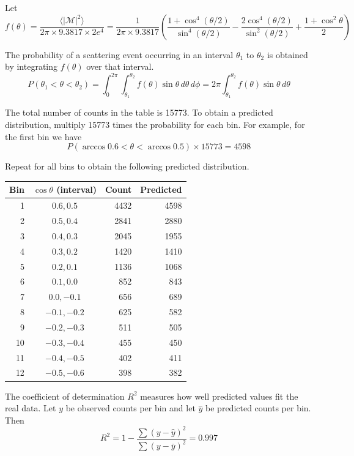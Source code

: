 \documentclass[12pt]{article}
\begin{document}
\noindent
Let
\begin{equation*}
f(\theta)=\frac{\langle|\mathcal{M}|^2\rangle}{2\pi\times9.3817\times 2e^4}
=\frac{1}{2\pi\times9.3817}
\left(
\frac{1+\cos^4(\theta/2)}{\sin^4(\theta/2)}
-\frac{2\cos^4(\theta/2)}{\sin^2(\theta/2)}
+\frac{1+\cos^2\theta}{2}
\right)
\end{equation*}

\noindent
The probability of a scattering event occurring in an interval $\theta_1$ to $\theta_2$ is obtained
by integrating $f(\theta)$ over that interval.
\begin{equation*}
P(\theta_1<\theta<\theta_2)=\int_0^{2\pi}\int_{\theta_1}^{\theta_2}f(\theta)\sin\theta\,d\theta\,d\phi
=2\pi\int_{\theta_1}^{\theta_2}f(\theta)\sin\theta\,d\theta
\end{equation*}

\noindent
The total number of counts in the table is 15773.
To obtain a predicted distribution,
multiply 15773 times the probability for each bin.
For example, for the first bin we have
\begin{equation*}
P(\arccos 0.6<\theta<\arccos 0.5) \times 15773=4598
\end{equation*}

\noindent
Repeat for all bins to obtain the following predicted distribution.
\begin{center}
\begin{tabular}{|r|c|r|r|}
\hline
Bin & $\cos\theta$ (interval) & Count & Predicted\\
\hline
1 & $0.6, 0.5$ & 4432 & 4598\\
2 & $0.5, 0.4$ & 2841 & 2880\\
3 & $0.4, 0.3$ & 2045 & 1955\\
4 & $0.3, 0.2$ & 1420 & 1410\\
5 & $0.2, 0.1$ & 1136 & 1068\\
6 & $0.1, 0.0$ & 852 & 843\\
7 & $0.0, -0.1$ & 656 & 689\\
8 & $-0.1, -0.2$ & 625 & 582\\
9 & $-0.2, -0.3$ & 511 & 505\\
10 & $-0.3, -0.4$ & 455 & 450\\
11 & $-0.4, -0.5$ & 402 & 411\\
12 & $-0.5, -0.6$ & 398 & 382\\
\hline
\end{tabular}
\end{center}

\noindent
The coefficient of determination $R^2$ measures how well predicted values fit the real data.
Let $y$ be observed counts per bin and let $\hat{y}$ be predicted counts per bin.
Then
\begin{equation*}
R^2=1-\frac{\sum(y-\hat{y})^2}{\sum(y-\bar{y})^2}=0.997
\end{equation*}
\end{document}
